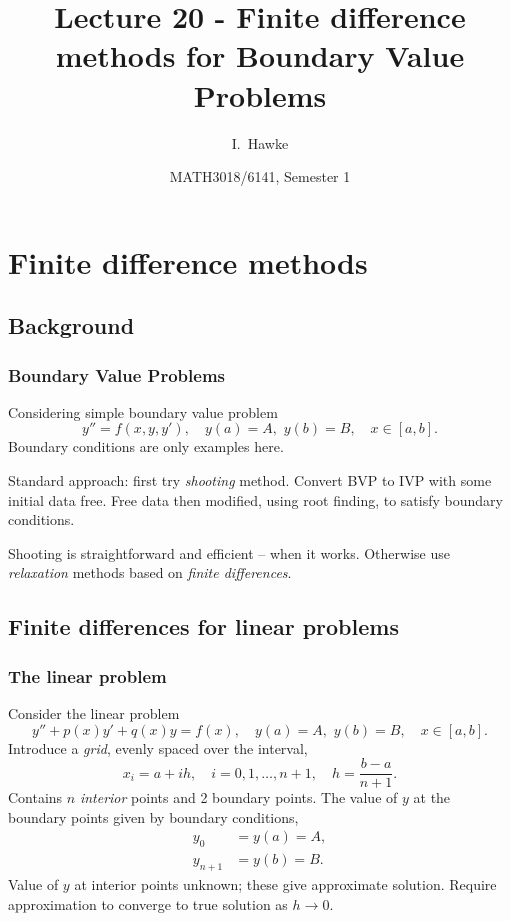 \documentclass{beamer}
\title[Lecture 20] %
{Lecture 20 - Finite difference methods for Boundary Value Problems}
\author[I. Hawke] %
{I.~Hawke}
\institute[University of Southampton] %
{
  School of Mathematics, \\
  University of Southampton, UK
}
\date[Semester 1] %
{MATH3018/6141, Semester 1}
\begin{document}
\begin{frame}
  \titlepage
\end{frame}

\section{Finite difference methods}

\subsection{Background}

\begin{frame}
  \frametitle{Boundary Value Problems}

  Considering simple boundary value problem
  \begin{equation*}
    y'' = f(x, y, y'), \quad y(a) = A, \,\, y(b) = B, \quad x \in [a,b].
  \end{equation*} \pause
  Boundary conditions are only examples here. \pause

  \vspace{1ex}

  Standard approach: first try \emph{shooting} method.  Convert BVP to
  IVP with some initial data free. Free data then modified, using root
  finding, to satisfy boundary conditions. \pause

  \vspace{1ex}

  Shooting is straightforward and efficient -- when it
  works. Otherwise use \emph{relaxation} methods based on \emph{finite
    differences}.

\end{frame}


\subsection{Finite differences for linear problems}

\begin{frame}
  \frametitle{The linear problem}

  Consider the linear problem
  \begin{equation*}
    y'' + p(x) y' + q(x) y =  f(x), \quad y(a) = A, \,\, y(b) = B,
    \quad x \in [a,b].
  \end{equation*} \pause
  Introduce a \emph{grid}, evenly spaced over the interval,
  \begin{equation*}
    x_i = a + i h, \quad i = 0, 1, \dots, n + 1, \quad h = \frac{b -
      a}{n + 1}.
  \end{equation*}
  Contains $n$ \emph{interior} points and 2 boundary points.
  \pause The value of $y$ at the boundary points given by
  boundary conditions,
  \begin{align*}
    y_0 & = y(a) = A, \\
    y_{n+1} & = y(b) = B.
  \end{align*} \pause
  Value of $y$ at interior points unknown; these
  give approximate solution. Require approximation to converge to
  true solution as $h \rightarrow 0$.

\end{frame}
\end{document}
